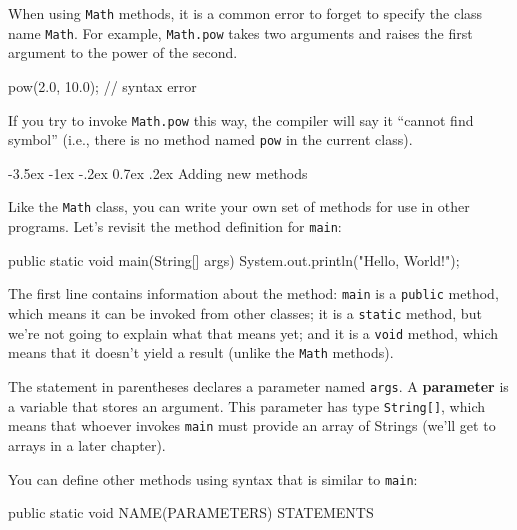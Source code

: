 \documentclass[12pt]{book}
\makeatletter
\theoremstyle{exercise}
\newcommand{\java}[1]{\verb"#1"}
\renewcommand{\section}{\@startsection {section}{1}{\z@}%
    {-3.5ex \@plus -1ex \@minus -.2ex}%
    {0.7ex \@plus.2ex}%
    {\normalfont\Large\bfseries}}
\newcommand{\java}[1]{\lstinline{#1}} %
\makeatother
\begin{document}
When using \java{Math} methods, it is a common error to forget to specify the class name \java{Math}.
For example, \java{Math.pow} takes two arguments and raises the first argument to the power of the second.

\begin{code}
    pow(2.0, 10.0);  // syntax error
\end{code}

If you try to invoke \java{Math.pow} this way, the compiler will say it ``cannot find symbol'' (i.e., there is no method named \java{pow} in the current class).


\section{Adding new methods}
\label{adding_methods}


Like the \java{Math} class, you can write your own set of methods for use in other programs.
Let's revisit the method definition for \java{main}:

\begin{code}
    public static void main(String[] args) {
        System.out.println("Hello, World!");
    }
\end{code}


The first line contains information about the method:
\java{main} is a \java{public} method, which means it can be invoked from other classes;
it is a \java{static} method, but we're not going to explain what that means yet;
and it is a \java{void} method, which means that it doesn't yield a result (unlike the \java{Math} methods).


The statement in parentheses declares a parameter named
\java{args}.  A {\bf parameter} is a variable that stores an argument.
This parameter has type \java{String[]}, which means that whoever invokes \java{main} must provide an array of Strings (we'll get to arrays in a later chapter).

You can define other methods using syntax that is similar to \java{main}:

\begin{code}
    public static void NAME(PARAMETERS) {
        STATEMENTS
    }
\end{code}
\end{document}
